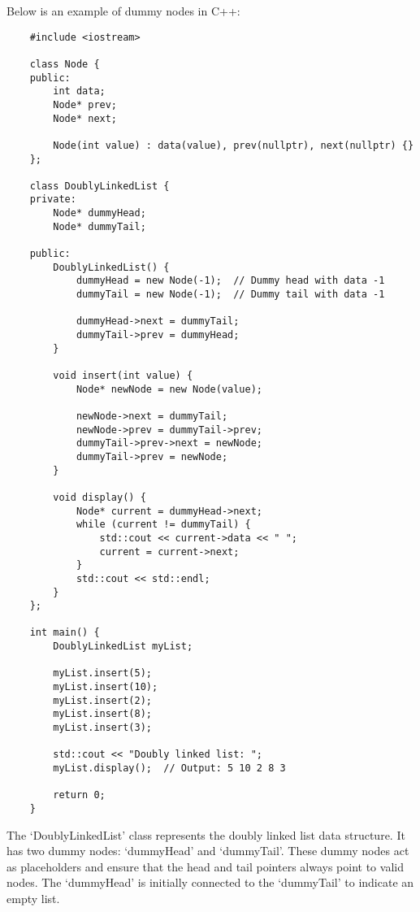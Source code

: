 \begin{solution}
    Below is an example of dummy nodes in C++:

    \horizontalline

    \begin{verbatim}
    #include <iostream>

    class Node {
    public:
        int data;
        Node* prev;
        Node* next;
    
        Node(int value) : data(value), prev(nullptr), next(nullptr) {}
    };
    
    class DoublyLinkedList {
    private:
        Node* dummyHead;
        Node* dummyTail;
    
    public:
        DoublyLinkedList() {
            dummyHead = new Node(-1);  // Dummy head with data -1
            dummyTail = new Node(-1);  // Dummy tail with data -1
    
            dummyHead->next = dummyTail;
            dummyTail->prev = dummyHead;
        }
    
        void insert(int value) {
            Node* newNode = new Node(value);
    
            newNode->next = dummyTail;
            newNode->prev = dummyTail->prev;
            dummyTail->prev->next = newNode;
            dummyTail->prev = newNode;
        }
    
        void display() {
            Node* current = dummyHead->next;
            while (current != dummyTail) {
                std::cout << current->data << " ";
                current = current->next;
            }
            std::cout << std::endl;
        }
    };
    
    int main() {
        DoublyLinkedList myList;
    
        myList.insert(5);
        myList.insert(10);
        myList.insert(2);
        myList.insert(8);
        myList.insert(3);
    
        std::cout << "Doubly linked list: ";
        myList.display();  // Output: 5 10 2 8 3
    
        return 0;
    }        
    \end{verbatim}

    \horizontalline

    The `DoublyLinkedList' class represents the doubly linked list data structure. It has two dummy nodes: `dummyHead' and `dummyTail'. These dummy nodes act as placeholders and ensure that the head and tail pointers always point to valid nodes. The `dummyHead' is initially connected to the `dummyTail' to indicate an empty list.


\end{solution}
